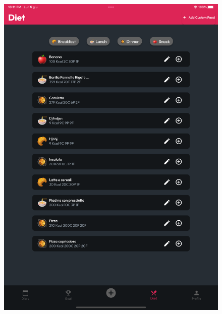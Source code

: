 \documentclass{Configuration_Files/PoliMi3i_thesis}
\begin{document}
\begin{figure}[!h]
  \centering
  \includegraphics[scale=0.1]{Images/Screenshots/Tablet/DietTablet.png}

\end{figure}
\end{document}

